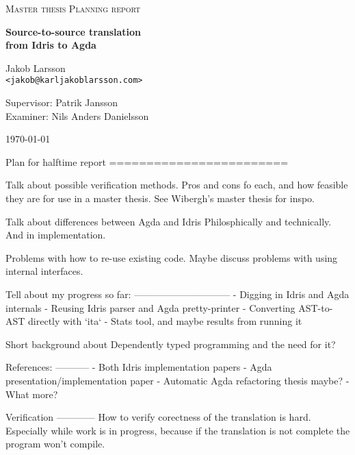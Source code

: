 \documentclass[parskip=half]{scrartcl}
\begin{document}
\begin{titlepage}

\centering
{\scshape\LARGE Master thesis Planning report}


\vspace{0.5cm}
{\huge\bfseries Source-to-source translation\\ from Idris to Agda
  }

\vspace{2cm}
{\Large Jakob Larsson\\}
\texttt{<jakob@karljakoblarsson.com>}

\vspace{1.0cm}
{\large Supervisor: Patrik Jansson  \\
        Examiner: Nils Anders Danielsson}

\vspace{1.5cm}

\vfill
{\large \today}

\end{titlepage}

Plan for halftime report
========================

Talk about possible verification methods. Pros and cons fo each, and how
feasible they are for use in a master thesis. See Wibergh's master thesis for
inspo.

Talk about differences between Agda and Idris
Philosphically and technically. And in implementation.

Problems with how to re-use existing code. Maybe discuss problems with using
internal interfaces.

Tell about my progress so far:
------------------------------
- Digging in Idris and Agda internals
- Reusing Idris parser and Agda pretty-printer
- Converting AST-to-AST directly with `ita`
- Stats tool, and maybe results from running it

Short background about Dependently typed programming and the need for it?

References:
-----------
- Both Idris implementation papers
- Agda presentation/implementation paper
- Automatic Agda refactoring thesis maybe?
- What more?


Verification
------------
How to verify corectness of the translation is hard. Especially while work is
in progress, because if the translation is not complete the program won't
compile.
\end{document}
